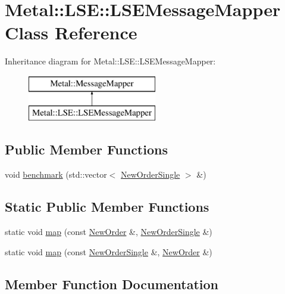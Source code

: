 \hypertarget{classMetal_1_1LSE_1_1LSEMessageMapper}{}\section{Metal\+:\+:L\+S\+E\+:\+:L\+S\+E\+Message\+Mapper Class Reference}
\label{classMetal_1_1LSE_1_1LSEMessageMapper}
Inheritance diagram for Metal\+:\+:L\+S\+E\+:\+:L\+S\+E\+Message\+Mapper\+:\begin{figure}[H]
\begin{center}
\leavevmode
\includegraphics[height=2.000000cm]{classMetal_1_1LSE_1_1LSEMessageMapper}
\end{center}
\end{figure}
\subsection*{Public Member Functions}
\begin{DoxyCompactItemize}
\item 
void \hyperlink{classMetal_1_1LSE_1_1LSEMessageMapper_a93d6ce927b366648680fbae723ec7b62}{benchmark} (std\+::vector$<$ \hyperlink{classMetal_1_1NewOrderSingle}{New\+Order\+Single} $>$ \&)
\end{DoxyCompactItemize}
\subsection*{Static Public Member Functions}
\begin{DoxyCompactItemize}
\item 
static void \hyperlink{classMetal_1_1LSE_1_1LSEMessageMapper_a5926c5ccb726ddf45eb1a794fa7ccb65}{map} (const \hyperlink{classMetal_1_1LSE_1_1NewOrder}{New\+Order} \&, \hyperlink{classMetal_1_1NewOrderSingle}{New\+Order\+Single} \&)
\item 
static void \hyperlink{classMetal_1_1LSE_1_1LSEMessageMapper_abfa0db422891f3258972e7622bcd2201}{map} (const \hyperlink{classMetal_1_1NewOrderSingle}{New\+Order\+Single} \&, \hyperlink{classMetal_1_1LSE_1_1NewOrder}{New\+Order} \&)
\end{DoxyCompactItemize}


\subsection{Member Function Documentation}
\hypertarget{classMetal_1_1LSE_1_1LSEMessageMapper_a93d6ce927b366648680fbae723ec7b62}{}
